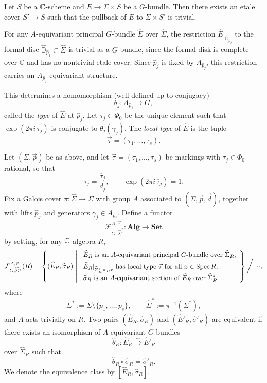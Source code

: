 \documentclass[12pt]{article}
\begin{document}
\begin{theorem}
    Let $S$ be a $\mathbb{C}$-scheme and $E\to \Sigma\times S$ be a $G$-bundle. Then there exists an etale cover $S'\to S$ such that the pullback of $E$ to $\Sigma\times S'$ is trivial.
\end{theorem}
For any \(A\)-equivariant principal \(G\)-bundle \(\widehat E\) over \(\widehat\Sigma\),
the restriction \(\widehat E|_{\widehat{\mathbb D}_{\widehat p_j}}\) to the formal disc
\(\widehat{\mathbb D}_{\widehat p_j}\subset \widehat\Sigma\) is trivial as a \(G\)-bundle, since the formal disk is complete over \(\mathbb C\) and has no nontrivial etale cover. 
Since \(\widehat p_j\) is fixed by \(A_{\widehat p_j}\), this restriction carries an
\(A_{\widehat p_j}\)-equivariant structure.

This determines a homomorphism (well-defined up to conjugacy)
\[
\theta_j : A_{\widehat p_j} \longrightarrow G,
\]
called the \emph{type} of \(\widehat E\) at \(\widehat p_j\). Let \(\tau_j \in \Phi_0\) be the unique element such that $\exp(2\pi i\, \tau_j)$
is conjugate to \(\theta_j(\gamma_j)\). The \emph{local type} of \(\widehat E\) is the tuple
\[
\vec\tau = (\tau_1,\dots,\tau_s).
\]



\begin{definition}\label{def:AG_functor}
    Let \((\Sigma,\vec p)\) be as above, and let \(\vec\tau=(\tau_1,\dots,\tau_s)\)
be markings with \(\tau_j \in \Phi_0\) rational, so that
\[
\tau_j = \frac{\overline\tau_j}{d_j}, \qquad \exp(2\pi i\, \overline\tau_j)=1.
\]
Fix a Galois cover \(\pi:\widehat\Sigma \to \Sigma\) with group \(A\) associated to
\((\Sigma,\vec p,\vec d)\), together with lifts \(\widehat p_j\) and generators
\(\gamma_j \in A_{\widehat p_j}\). Define a functor
\[
\mathcal F^{A,\vec\tau}_{G,\widehat\Sigma^*} : \mathbf{Alg} \to \mathbf{Set}
\]
by setting, for any \(\mathbb{C}\)-algebra \(R\),
\[
\mathcal F^{A,\vec\tau}_{G,\widehat\Sigma^*}(R)
=
\left\{
(\widehat E_R, \widehat\sigma_R)
\ \middle|\
\begin{array}{l}
\widehat E_R \text{ is an } A\text{-equivariant principal } G\text{-bundle over } \widehat\Sigma_R,\\[4pt]
\widehat E_R|_{\widehat\Sigma^*_R \times_R x} \text{ has local type } \vec\tau \text{ for all } x \in \operatorname{Spec} R,\\[4pt]
\widehat\sigma_R \text{ is an } A\text{-equivariant section of } \widehat E_R \text{ over } \widehat\Sigma^*_R
\end{array}
\right\}\bigg/\sim,
\]
where
\[
\Sigma^* := \Sigma \setminus \{p_1,\dots,p_s\}, 
\qquad
\widehat\Sigma^* := \pi^{-1}(\Sigma^*),
\]
and \(A\) acts trivially on \(R\). Two pairs \((\widehat E_R,\widehat\sigma_R)\) and \((\widehat E'_R,\widehat\sigma'_R)\)
are equivalent if there exists an isomorphism of \(A\)-equivariant \(G\)-bundles
\[
\widehat\theta_R : \widehat E_R \xrightarrow{\sim} \widehat E'_R
\]
over \(\widehat\Sigma_R\) such that
\[
\widehat\theta_R \circ \widehat\sigma_R = \widehat\sigma'_R.
\] We denote the equivalence class by \([\widehat E_R,\widehat\sigma_R]\).
\end{definition}
\end{document}
